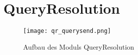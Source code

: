
\section{QueryResolution}

\begin{figure}[htb]
  	\texttt{[image: qr\_querysend.png]}
  	\caption{Aufbau des Moduls QueryResolution}
	\label{fig:Aufbau des Moduls QueryResolution}
\end{figure}


\newpage

\newpage

\newpage




